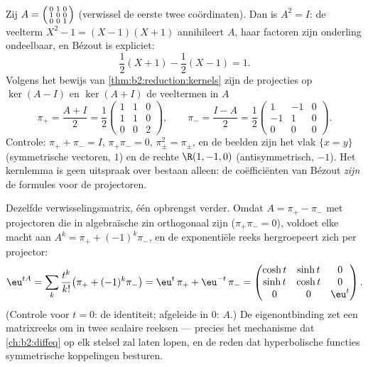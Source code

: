 \begin{example}\label{ex:b2:reduction:projectorswork}
Zij $A = \begin{psmallmatrix}0 & 1 & 0\\ 1 & 0 & 0\\ 0 & 0 &
1\end{psmallmatrix}$ (verwissel de eerste twee coördinaten). Dan is
$A^2 = I$: de veelterm $X^2 - 1 = (X - 1)(X + 1)$ annihileert $A$,
haar factoren zijn onderling ondeelbaar, en Bézout is expliciet:
\[
\frac{1}{2}(X + 1) - \frac12(X - 1) = 1 .
\]
Volgens het bewijs van \cref{thm:b2:reduction:kernels} zijn de
projecties op $\ker(A - I)$ en $\ker(A + I)$ de veeltermen in $A$
\[
\pi_+ = \frac{A + I}{2} = \frac12\begin{pmatrix}
1 & 1 & 0\\ 1 & 1 & 0\\ 0 & 0 & 2\end{pmatrix},
\qquad
\pi_- = \frac{I - A}{2} = \frac12\begin{pmatrix}
1 & -1 & 0\\ -1 & 1 & 0\\ 0 & 0 & 0\end{pmatrix}.
\]
Controle: $\pi_+ + \pi_- = I$, $\pi_+\pi_- = 0$, $\pi_\pm^2 =
\pi_\pm$, en de beelden zijn het vlak $\{x = y\}$ (symmetrische
vectoren,  $1$) en de rechte $\R(1, -1, 0)$
(antisymmetrisch,  $-1$). Het kernlemma is geen
uitspraak over bestaan alleen: de coëfficiënten van Bézout
\emph{zijn} de formules voor de projectoren.
\end{example}

\begin{example}\label{ex:b2:reduction:expprojectors}
Dezelfde verwisselingsmatrix, één opbrengst verder. Omdat $A =
\pi_+ - \pi_-$ met projectoren die in algebraïsche zin orthogonaal
zijn ($\pi_+\pi_- = 0$), voldoet elke macht aan $A^k = \pi_+ +
(-1)^k\pi_-$, en de exponentiële reeks hergroepeert zich per
projector:
\[
\eu^{tA} = \sum_k \frac{t^k}{k!}\bigl(\pi_+ +
(-1)^k\pi_-\bigr)
= \eu^{t}\,\pi_+ + \eu^{-t}\,\pi_- =
\begin{pmatrix}
\cosh t & \sinh t & 0\\
\sinh t & \cosh t & 0\\
0 & 0 & \eu^{t}
\end{pmatrix}.
\]
(Controle voor $t = 0$: de identiteit; afgeleide in $0$: $A$.) De
eigenontbinding zet een matrixreeks om in twee scalaire reeksen ---
precies het mechanisme dat \cref{ch:b2:diffeq} op elk
 stelsel zal laten lopen, en de reden dat
hyperbolische functies symmetrische koppelingen besturen.
\end{example}

